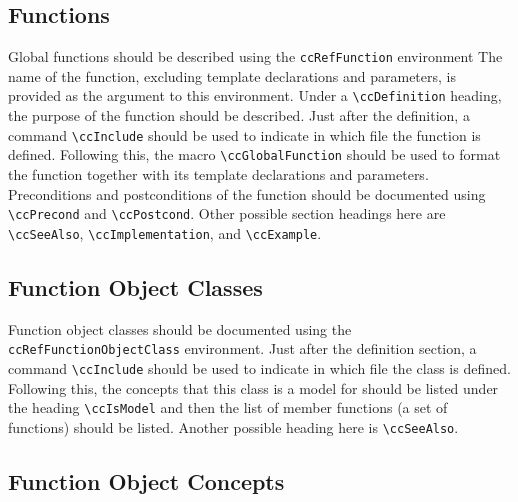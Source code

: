 \subsection{Functions}
\label{sec:ref_function}

Global functions should be described using the {\tt ccRefFunction} environment%
The name of the function, excluding template declarations and parameters,
is provided as the argument to this environment.  Under a \verb|\ccDefinition|
heading, the purpose of the function should be described. Just after the
definition, a command \verb|\ccInclude| should be used to indicate in which
file the function is defined.  Following this, the macro
\verb|\ccGlobalFunction| should be used to format the function together with its
template declarations and parameters.  Preconditions and postconditions 
of the function should be documented using \verb|\ccPrecond| and 
\verb|\ccPostcond|. Other possible section headings here are
\verb|\ccSeeAlso|, \verb|\ccImplementation|, and \verb|\ccExample|.

\subsection{Function Object Classes }
\label{sec:ref_function_object_class}

Function object classes should be documented using the
{\tt ccRefFunctionObjectClass} environment.  
Just after the definition section, a command \verb|\ccInclude| should be
used to indicate in which file the class is defined.  Following this,
the concepts that this class is a model for should be listed under
the heading \verb|\ccIsModel| and then the list of
member functions (a set of  functions) should be
listed. Another possible heading here is \verb|\ccSeeAlso|.

\subsection{Function Object Concepts}
\label{sec:ref_function_object_concept}

